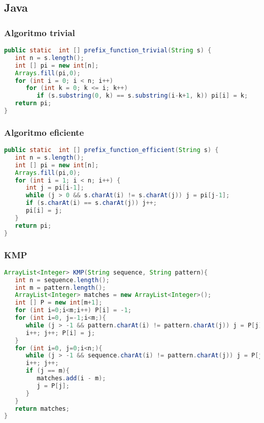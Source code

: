 \subsection{Java}

\subsubsection{Algoritmo trivial}
\begin{lstlisting}[language=Java]
public static  int [] prefix_function_trivial(String s) {
   int n = s.length();
   int [] pi = new int[n];
   Arrays.fill(pi,0);
   for (int i = 0; i < n; i++)
      for (int k = 0; k <= i; k++)
         if (s.substring(0, k) == s.substring(i-k+1, k)) pi[i] = k;
   return pi;
}
\end{lstlisting}

\subsubsection{Algoritmo eficiente} 
\begin{lstlisting}[language=Java]
public static  int [] prefix_function_efficient(String s) {
   int n = s.length();
   int [] pi = new int[n];
   Arrays.fill(pi,0);
   for (int i = 1; i < n; i++) {
      int j = pi[i-1];
      while (j > 0 && s.charAt(i) != s.charAt(j)) j = pi[j-1];
      if (s.charAt(i) == s.charAt(j)) j++;
      pi[i] = j;
   }
   return pi;
}
\end{lstlisting}

\subsubsection{KMP} 
\begin{lstlisting}[language=Java]
ArrayList<Integer> KMP(String sequence, String pattern){
   int n = sequence.length();
   int m = pattern.length();
   ArrayList<Integer> matches = new ArrayList<Integer>();
   int [] P = new int[m+1];
   for (int i=0;i<m;i++) P[i] = -1;
   for (int i=0, j=-1;i<m;){
      while (j > -1 && pattern.charAt(i) != pattern.charAt(j)) j = P[j];
      i++; j++; P[i] = j;
   }
   for (int i=0, j=0;i<n;){
      while (j > -1 && sequence.charAt(i) != pattern.charAt(j)) j = P[j];
      i++; j++;
      if (j == m){
         matches.add(i - m);
         j = P[j];
      }
   }
   return matches;
}
\end{lstlisting}
